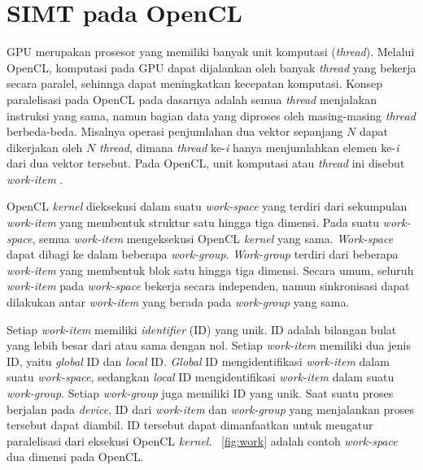 \section{SIMT pada OpenCL}
GPU merupakan prosesor yang memiliki banyak unit komputasi (\textit{thread}). Melalui OpenCL, komputasi pada GPU dapat dijalankan oleh banyak \textit{thread} yang bekerja secara paralel, sehinnga dapat meningkatkan kecepatan komputasi. Konsep paralelisasi pada OpenCL pada dasarnya adalah semua \textit{thread} menjalakan instruksi yang sama, namun bagian data yang diproses oleh masing-masing \textit{thread} berbeda-beda. Misalnya operasi penjumlahan dua vektor sepanjang $N$ dapat dikerjakan oleh $N$ \textit{thread}, dimana \textit{thread} ke-\textit{i} hanya menjumlahkan elemen ke-\textit{i} dari dua vektor tersebut. Pada OpenCL, unit komputasi atau \textit{thread} ini disebut \textit{work-item} \cite{opencl}. 

OpenCL \textit{kernel} dieksekusi dalam suatu \textit{work-space} yang terdiri dari sekumpulan \textit{work-item} yang membentuk struktur satu hingga tiga dimensi. Pada suatu \textit{work-space}, semua \textit{work-item} mengeksekusi OpenCL \textit{kernel} yang sama. \textit{Work-space} dapat dibagi ke dalam beberapa \textit{work-group}. \textit{Work-group} terdiri dari beberapa \textit{work-item} yang membentuk blok satu hingga tiga dimensi. Secara umum, seluruh \textit{work-item} pada \textit{work-space} bekerja secara independen, namun sinkronisasi dapat dilakukan antar \textit{work-item} yang berada pada \textit{work-group} yang sama.

Setiap \textit{work-item} memiliki \textit{identifier} (ID) yang unik. ID adalah bilangan bulat yang lebih besar dari atau sama dengan nol. Setiap \textit{work-item} memiliki dua jenis ID, yaitu \textit{global} ID dan \textit{local} ID. \textit{Global} ID mengidentifikasi \textit{work-item} dalam suatu \textit{work-space}, sedangkan \textit{local} ID mengidentifikasi \textit{work-item} dalam suatu \textit{work-group}. Setiap \textit{work-group} juga memiliki ID yang unik. Saat suatu proses berjalan pada \textit{device}, ID dari \textit{work-item} dan \textit{work-group} yang menjalankan proses tersebut dapat diambil. ID tersebut dapat dimanfaatkan untuk mengatur paralelisasi dari eksekusi OpenCL \textit{kernel}. \pic~\ref{fig:work} adalah contoh \textit{work-space} dua dimensi pada OpenCL.

